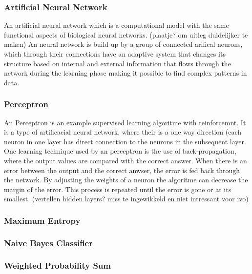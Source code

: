\documentclass[11pt]{article}
\begin{document}

\subsubsection{Artificial Neural Network}
 An artificial neural network which is a computational  model with the same functional aspects of biological neural networks. (plaatje? om uitleg duidelijker te maken)  An neural network is build up by a group of connected arifical neurons, which through their connections have an adaptive system that changes its structure based on internal and external information that flows through the network during the learning phase making it possible to find complex patterns in data.



\subsubsection{Perceptron}

An Perceptron is an example  supervised learning algoritme with reinforcemnt. It is a type of artificacial neural network, where their is a one way direction (each neuron in one layer has direct connection to the neurons in the subsequent layer. One learning technique used by an perceptron is the use of back-propagation, where the output values are compared with the correct answer. When there is an error between the output and the correct anwser, the error is fed back through the network. By adjusting the weights of a neuron the algoritme can decrease the margin of the error. This process is repeated until the error is gone or at its smallest. 
(vertellen  hidden layers? miss te ingewikkeld en niet intressant voor ivo)


\subsubsection{Maximum Entropy}



\subsubsection{Naive Bayes Classifier}

\subsubsection{Weighted Probability Sum}
\end{document}
